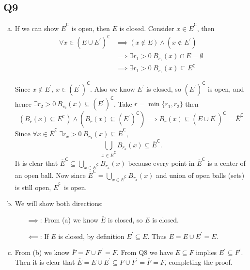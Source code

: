 \documentclass[12pt,lettersize]{article}
\newcommand{\com}{\mathsf{C}}
\begin{document}
	\subsection*{Q9}
	\begin{enumerate}[(a)]
		\item If we can show $\overline{E}^\com$ is open, then $\overline{E}$ is closed. Consider $x\in\overline{E}^\com$, then
		\begin{align*}
			\forall x\in(E\cup E^\prime)^\com &\implies (x\notin E)\land(x\notin E^\prime)\\
								   &\implies \exists r_1>0\ B_{r_1}(x)\cap E=\emptyset\\
								   &\implies \exists r_1>0\ B_{r_1}(x)\subseteq E^\com
		\end{align*}
		
		Since $x\notin E^\prime$, $x\in(E^\prime)^\com$. Also we know $E^\prime$ is closed, so $(E^\prime)^\com$ is open, and hence $\exists r_2>0\ B_{r_2}(x)\subseteq (E^\prime)^\com$. Take $r=\min\{r_1,r_2\}$ then
		\begin{displaymath}
			(B_r(x)\subseteq E^\com)\land(B_r(x)\subseteq (E^\prime)^\com)\implies B_r(x)\subseteq(E\cup E^\prime)^\com=\overline{E}^\com
		\end{displaymath}
		Since $\forall x\in\overline{E}^\com\ \exists r_x>0\ B_{r_x}(x)\subseteq\overline{E}^\com$,
		\begin{displaymath}
			\bigcup_{x\in\overline{E}^\com}^{}B_{r_x}(x)\subseteq \overline{E}^\com.
		\end{displaymath} 
		It is clear that $\overline{E}^\com\subseteq\bigcup_{x\in\overline{E}^\com}B_{r_x}(x)$ because every point in $\overline{E}^\com$ is a center of an open ball. Now since $\overline{E}^\com=\bigcup_{x\in\overline{E}^\com}B_{r_x}(x)$ and union of open balls (sets) is still open, $\overline{E}^\com$ is open. 
		
		\item We will show both directions:
		\begin{itemize}
			\item[$\implies$:] From (a) we know $\overline{E}$ is closed, so $E$ is closed.
			\item[$\impliedby$:] If $E$ is closed, by definition $E^\prime\subseteq E$. Thus $\overline{E}=E\cup E^\prime=E$.
		\end{itemize}
	
		\item From (b) we know $\overline{F}=F\cup F^\prime=F$. From Q8 we have $E\subseteq F$ implies $E^\prime\subseteq F^\prime$. Then it is clear that $\overline{E}=E\cup E^\prime\subseteq F\cup F^\prime=\overline{F}=F$, completing the proof.
	\end{enumerate}
	\newpage
	
\end{document}
